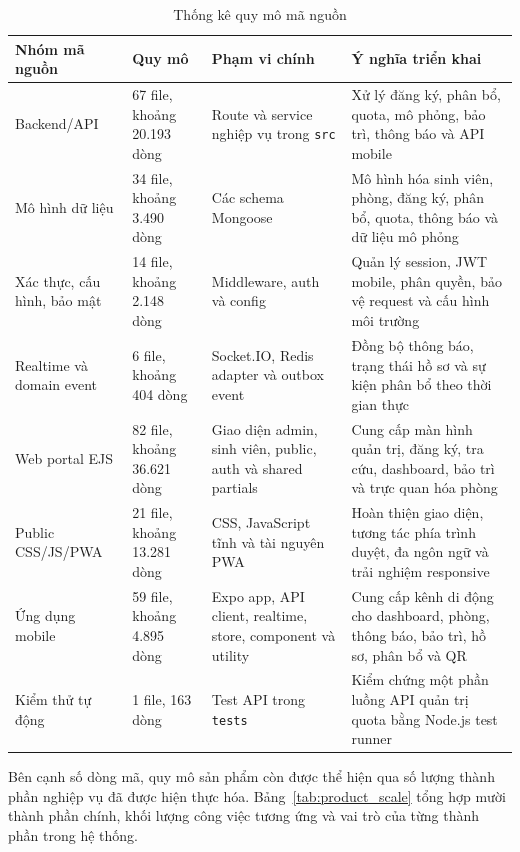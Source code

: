\documentclass[../DoAn.tex]{subfiles}
\begin{document}
\begin{table}[H]
\centering
\caption{Thống kê quy mô mã nguồn}
\label{tab:source_scale}
\footnotesize
\setlength{\tabcolsep}{3pt}
\renewcommand{\arraystretch}{1.15}
\begin{tabular}{|p{2.8cm}|p{2.2cm}|p{4.0cm}|p{4.0cm}|}
\hline
\textbf{Nhóm mã nguồn} & \textbf{Quy mô} & \textbf{Phạm vi chính} & \textbf{Ý nghĩa triển khai} \\
\hline
Backend/API & 67 file, khoảng 20.193 dòng & Route và service nghiệp vụ trong \texttt{src} & Xử lý đăng ký, phân bổ, quota, mô phỏng, bảo trì, thông báo và API mobile \\
\hline
Mô hình dữ liệu & 34 file, khoảng 3.490 dòng & Các schema Mongoose & Mô hình hóa sinh viên, phòng, đăng ký, phân bổ, quota, thông báo và dữ liệu mô phỏng \\
\hline
Xác thực, cấu hình, bảo mật & 14 file, khoảng 2.148 dòng & Middleware, auth và config & Quản lý session, JWT mobile, phân quyền, bảo vệ request và cấu hình môi trường \\
\hline
Realtime và domain event & 6 file, khoảng 404 dòng & Socket.IO, Redis adapter và outbox event & Đồng bộ thông báo, trạng thái hồ sơ và sự kiện phân bổ theo thời gian thực \\
\hline
Web portal EJS & 82 file, khoảng 36.621 dòng & Giao diện admin, sinh viên, public, auth và shared partials & Cung cấp màn hình quản trị, đăng ký, tra cứu, dashboard, bảo trì và trực quan hóa phòng \\
\hline
Public CSS/JS/PWA & 21 file, khoảng 13.281 dòng & CSS, JavaScript tĩnh và tài nguyên PWA & Hoàn thiện giao diện, tương tác phía trình duyệt, đa ngôn ngữ và trải nghiệm responsive \\
\hline
Ứng dụng mobile & 59 file, khoảng 4.895 dòng & Expo app, API client, realtime, store, component và utility & Cung cấp kênh di động cho dashboard, phòng, thông báo, bảo trì, hồ sơ, phân bổ và QR \\
\hline
Kiểm thử tự động & 1 file, 163 dòng & Test API trong \texttt{tests} & Kiểm chứng một phần luồng API quản trị quota bằng Node.js test runner \\
\hline
\end{tabular}
\end{table}

Bên cạnh số dòng mã, quy mô sản phẩm còn được thể hiện qua số lượng thành phần
nghiệp vụ đã được hiện thực hóa. Bảng~\ref{tab:product_scale} tổng hợp mười
thành phần chính, khối lượng công việc tương ứng và vai trò của từng thành phần
trong hệ thống.
\end{document}
